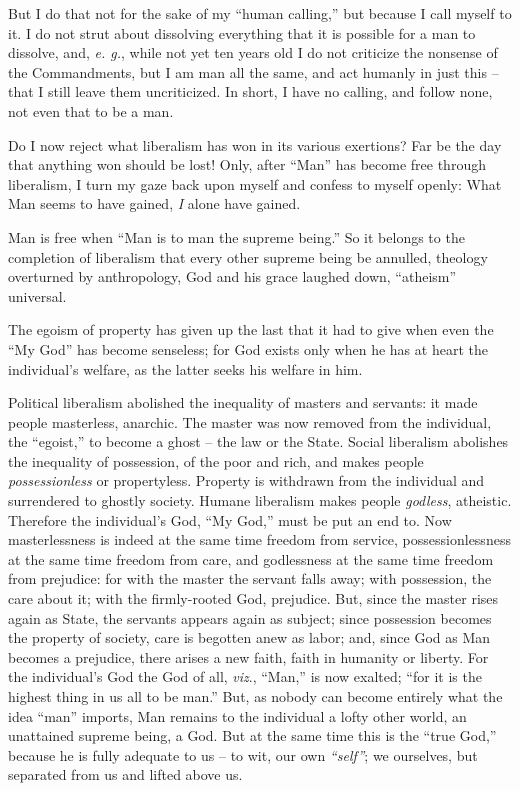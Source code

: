 \documentclass[12pt,a4paper]{book}
\begin{document}
But I do that not for the sake of my ``human calling,'' but because I call 
myself to it. I do not strut about dissolving everything that it is possible 
for a man to dissolve, and, \textit{e. g.}, while not yet ten years old I do 
not criticize the nonsense of the Commandments, but I am man all the same, and 
act humanly in just this -- that I still leave them uncriticized. In short, I 
have no calling, and follow none, not even that to be a man.

Do I now reject what liberalism has won in its various exertions? Far be the 
day that anything won should be lost! Only, after ``Man'' has become free 
through liberalism, I turn my gaze back upon myself and confess to myself 
openly: What Man seems to have gained, \textit{I} alone have gained.

Man is free when ``Man is to man the supreme being.'' So it belongs to the 
completion of liberalism that every other supreme being be annulled, theology 
overturned by anthropology, God and his grace laughed down, ``atheism'' 
universal.

The egoism of property has given up the last that it had to give when even the 
``My God'' has become senseless; for God exists only when he has at heart 
the individual's welfare, as the latter seeks his welfare in him.

Political liberalism abolished the inequality of masters and servants: it made 
people masterless, anarchic. The master was now removed from the individual, 
the ``egoist,'' to become a ghost -- the law or the State. Social liberalism 
abolishes the inequality of possession, of the poor and rich, and makes people 
\textit{possessionless} or propertyless. Property is withdrawn from the 
individual and surrendered to ghostly society. Humane liberalism makes people 
\textit{godless}, atheistic. Therefore the individual's God, ``My God,'' 
must be put an end to. Now masterlessness is indeed at the same time freedom 
from service, possessionlessness at the same time freedom from care, and 
godlessness at the same time freedom from prejudice: for with the master the 
servant falls away; with possession, the care about it; with the firmly-rooted 
God, prejudice. But, since the master rises again as State, the servants 
appears again as subject; since possession becomes the property of society, 
care is begotten anew as labor; and, since God as Man becomes a prejudice, 
there arises a new faith, faith in humanity or liberty. For the individual's 
God the God of all, \textit{viz}., ``Man,'' is now exalted; ``for it is the 
highest thing in us all to be man.'' But, as nobody can become entirely what 
the idea ``man'' imports, Man remains to the individual a lofty other world, 
an unattained supreme being, a God. But at the same time this is the ``true 
God,'' because he is fully adequate to us -- to wit, our own 
\textit{``self''}; we ourselves, but separated from us and lifted above us.
\end{document}
